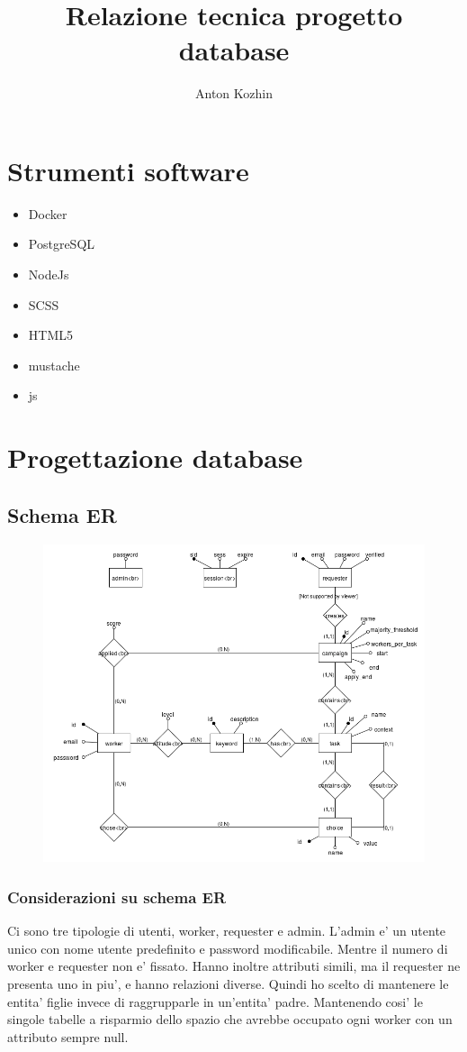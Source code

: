 \documentclass[a4paper]{article}
\title{Relazione tecnica progetto database}
\author{Anton Kozhin}
\begin{document}
\maketitle

\section{Strumenti software}
\begin{itemize}
\item Docker
\item PostgreSQL
\item NodeJs
\item SCSS
\item HTML5
\item mustache
\item js
\end{itemize}

\section{Progettazione database}
\subsection{Schema ER}

\begin{figure}[H]
\includegraphics[width=\textwidth]{ER.png}
\end{figure}

\subsubsection{Considerazioni su schema ER}
Ci sono tre tipologie di utenti, worker, requester e admin.
L'admin e' un utente unico con nome utente predefinito e password modificabile.
Mentre il numero di worker e requester non e' fissato. Hanno inoltre attributi simili, ma il requester ne presenta uno in piu', e hanno relazioni diverse.
Quindi ho scelto di mantenere le entita' figlie invece di raggrupparle in un'entita' padre. Mantenendo cosi' le singole tabelle a risparmio dello spazio che avrebbe occupato ogni worker con un attributo sempre null.
\end{document}
